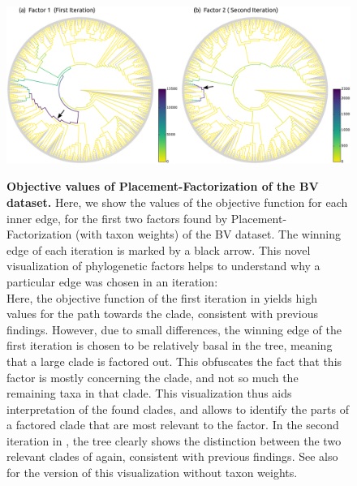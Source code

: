 \begin{figure}[hbt!]
    \centering
    \includegraphics[width=\linewidth]{pdf/pf_bv_place_tw_ovs.pdf}
    \begin{subfigure}{0pt}
        \label{fig:pf_bv_place_tw_ovs:sub:first}
    \end{subfigure}
    \begin{subfigure}{0pt}
        \label{fig:pf_bv_place_tw_ovs:sub:second}
    \end{subfigure}
    \caption{
        \textbf{Objective values of Placement-Factorization of the \ac{BV} dataset.}
        Here, we show the values of the objective function for each inner edge,
        for the first two factors found by Placement-Factorization (with taxon weights) of the \ac{BV} dataset.
        The winning edge of each iteration is marked by a black arrow.
        This novel visualization of phylogenetic factors helps to understand
        why a particular edge was chosen in an iteration:
        \\
        Here, the objective function of the first iteration in 
        yields high values for the path towards the  clade, consistent with previous findings.
        However, due to small differences, the winning edge of the first iteration
        is chosen to be relatively basal in the tree, meaning that a large clade is factored out.
        This obfuscates the fact that this factor is mostly concerning the  clade,
        and not so much the remaining taxa in that clade.
        This visualization thus aids interpretation of the found clades,
        and allows to identify the parts of a factored clade that are most relevant to the factor.
        In the second iteration in ,
        the tree clearly shows the distinction between the two relevant clades of  again,
        consistent with previous findings.
        See also  for the version of this visualization without taxon weights.
    }
    \label{fig:pf_bv_place_tw_ovs}
\end{figure}

